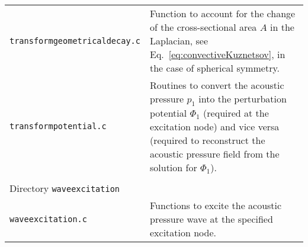 \begin{longtable}{p{} p{}}
{\tt transformgeometricaldecay.c} & Function to account for the change of the cross-sectional area $A$ in the Laplacian, see Eq.~\eqref{eq:convectiveKuznetsov}, in the case of spherical symmetry. \\
{\tt transformpotential.c} & Routines to convert the acoustic pressure $p_1$ into the perturbation potential $\Phi_1$ (required at the excitation node) and vice versa (required to reconstruct the acoustic pressure field from the solution for $\Phi_1$). \\
\\
\hline Directory {\tt waveexcitation} &\\ \hline
{\tt waveexcitation.c} & Functions to excite the acoustic pressure wave at the specified excitation node. \\
 \hline
\end{longtable} \vspace{1em}

